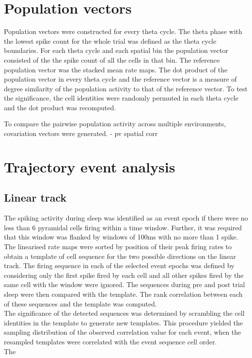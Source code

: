 \section{Population vectors}
Population vectors were constructed for every theta cycle. The theta phase with the lowest spike count for the whole trial was defined as the theta cycle boundaries. For each theta cycle and each spatial bin the population vector consisted of the the spike count of all the cells in that bin. The reference population vector was the stacked mean rate maps. The dot product of the population vector in every theta cycle and the reference vector is a measure of degree similarity of the population activity to that of the reference vector. To test the significance, the cell identities were randomly permuted in each theta cycle and the dot product was recomputed. 

To compare the pairwise population activity across multiple environments, covariation vectors were generated. 
\cite{Gothard1996} - pv spatial corr 

\section{Trajectory event analysis}
\subsection{Linear track}
The spiking activity during sleep was identified as an event epoch if there were no less than 6 pyramidal cells firing within a time window. Further, it was required that this window was flanked by windows of 100ms with no more than 1 spike. The linearised rate maps were sorted by position of their peak firing rates to obtain a template of cell sequence for the two possible directions on the linear track. The firing sequence in each of the selected event epochs was defined by considering only the first spike fired by each cell and all other spikes fired by the same cell with the window were ignored. The sequences during pre and post trial sleep were then compared with the template. The rank correlation between each of these sequences and the template was computed. \\ 
The significance of the detected sequences was determined by scrambling the cell identities in the template to generate new templates. This procedure yielded the sampling distribution of the observed correlation value for each event, when the resampled templates were correlated with the event sequence cell order. \\
The 

